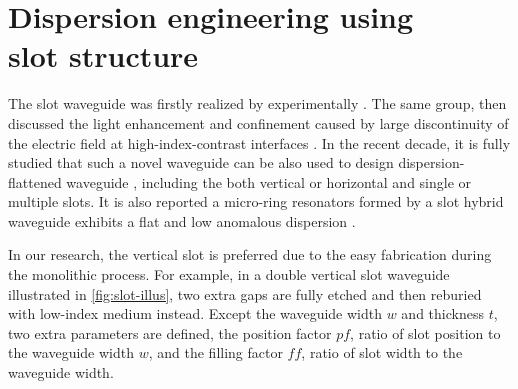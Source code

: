 \section[{Dispersion engineering using slot structure}]{Dispersion engineering using \\ slot structure}

The slot waveguide was firstly realized by \citeauthor{Xu2004} experimentally \cite{Xu2004}. The same group, \citeauthor{Almeida2004} then discussed the light enhancement and confinement caused by large discontinuity of the electric field at high-index-contrast interfaces \cite{Almeida2004}. In the recent decade, it is fully studied that such a novel waveguide can be also used to design dispersion-flattened waveguide \cites{Mas2010, Zhang2010, Zhu2012, Nolte2013}, including the both vertical or horizontal and single or multiple slots. It is also reported a micro-ring resonators formed by a slot hybrid waveguide 
exhibits a flat and low anomalous dispersion \cite{Zhang2013}.

In our research, the vertical slot is preferred due to the easy fabrication during the monolithic process. 
For example, in a double vertical slot waveguide illustrated in \autoref{fig:slot-illus}, two extra gaps are fully etched and then reburied with low-index medium instead. 
Except the waveguide width $w$ and thickness $t$, two extra parameters are defined, the position factor $ \mathit{pf} $, ratio of slot position to the waveguide width $w$, and the filling factor $ \mathit{ff} $, ratio of slot width to the waveguide width.

\begin{figure}
		\centering	
		
		\label{fig:slot-illus}
\end{figure}


\begin{figure}
	\centering
	
 	\label{fig:slot-mode}
\end{figure}


